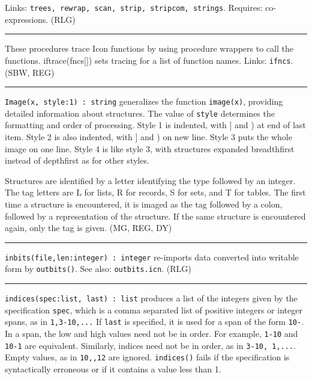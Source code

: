 Links: \texttt{trees, rewrap, scan, strip, stripcom, strings}. Requires:
co-expressions. (RLG)

\vspace{0.25cm}\hrule{}

These procedures trace Icon functions by using procedure
wrappers to call the functions. iftrace(fncs[]) sets tracing for a list
of function names. Links: \texttt{ifncs}. (SBW, REG)

\vspace{0.25cm}\hrule{}

\texttt{Image(x, style:1) : string} generalizes the function
\texttt{image(x)}, providing detailed information about structures. The
value of \texttt{style} determines the formatting and order of
processing. Style 1 is indented, with ] and ) at end of last item.
Style 2 is also indented, with ] and ) on new line. Style 3 puts the
whole image on one line. Style 4 is like style 3, with structures
expanded breadthfirst instead of depthfirst as for other styles.

Structures are identified by a letter identifying the type followed by
an integer. The tag letters are {\textquotedbl}L{\textquotedbl} for
lists, {\textquotedbl}R{\textquotedbl} for records,
{\textquotedbl}S{\textquotedbl} for sets, and
{\textquotedbl}T{\textquotedbl} for tables. The first time a structure
is encountered, it is imaged as the tag followed by a colon, followed
by a representation of the structure. If the same structure is
encountered again, only the tag is given. (MG, REG, DY)

\vspace{0.25cm}\hrule{}

\texttt{inbits(file,len:integer) : integer} re-imports data converted
into writable form by \texttt{outbits()}. See also:
\texttt{outbits.icn}. (RLG)

\vspace{0.25cm}\hrule{}

\texttt{indices(spec:list, last) : list} produces a list of the integers
given by the specification \texttt{spec}, which is a comma separated
list of positive integers or integer spans, as in
\texttt{{\textquotedbl}1,3-10,...{\textquotedbl}} If \texttt{last} is
specified, it is used for a span of the form
\texttt{{\textquotedbl}10-{\textquotedbl}}. In a span, the low and high
values need not be in order. For example,
\texttt{{\textquotedbl}1-10{\textquotedbl}} and
\texttt{{\textquotedbl}10-1{\textquotedbl}} are equivalent. Similarly,
indices need not be in order, as in \texttt{{\textquotedbl}3-10,
1,...{\textquotedbl}}. Empty values, as in
\texttt{{\textquotedbl}10,,12{\textquotedbl}} are ignored.
\texttt{indices()} fails if the specification is syntactically
erroneous or if it contains a value less than 1. 

